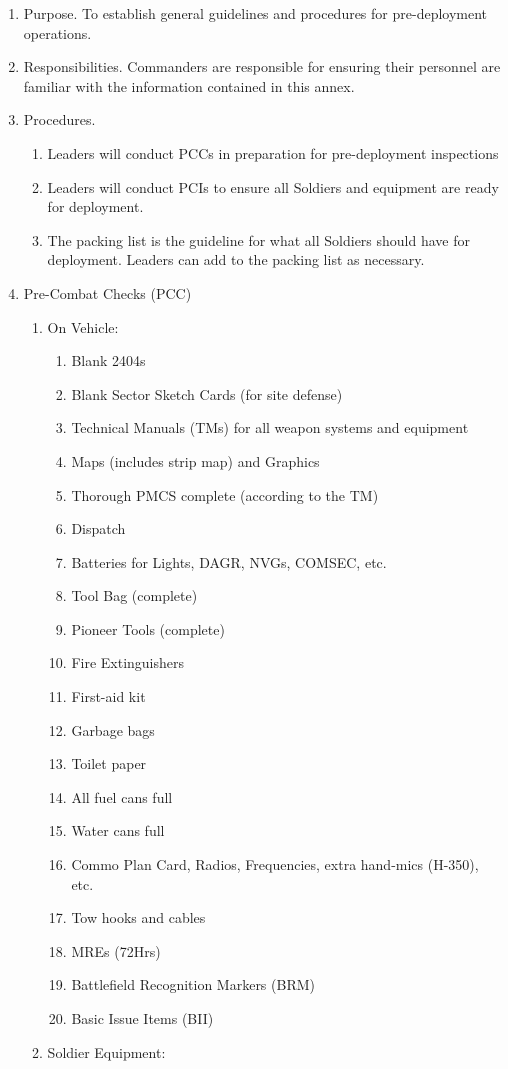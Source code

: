 \documentclass{article}
\begin{document}
\begin{enumerate}
    \item Purpose.  To establish general guidelines and procedures for pre-deployment operations.

\item Responsibilities.  Commanders are responsible for ensuring their personnel are familiar with the information contained in this annex.

\item Procedures.
\begin{enumerate}
    \item Leaders will conduct PCCs in preparation for pre-deployment inspections
	\item Leaders will conduct PCIs to ensure all Soldiers and equipment are ready for deployment.
	\item The packing list is the guideline for what all Soldiers should have for deployment. Leaders can add to the packing list as necessary.
\end{enumerate}
\item Pre-Combat Checks (PCC)
\begin{enumerate}
    \item On Vehicle:
    \begin{enumerate}
         
\item	Blank 2404s					
\item	Blank Sector Sketch Cards (for site defense)
\item	Technical Manuals (TMs) for all weapon systems and equipment
\item Maps (includes strip map) and Graphics
\item	Thorough PMCS complete (according to the TM)
\item Dispatch
\item Batteries for Lights, DAGR, NVGs, COMSEC, etc.
\item Tool Bag (complete)
\item Pioneer Tools (complete)
\item Fire Extinguishers
\item First-aid kit
\item Garbage bags
\item Toilet paper
\item All fuel cans full
\item Water cans full
\item	Commo Plan Card, Radios, Frequencies, extra hand-mics (H-350), etc.
\item	Tow hooks and cables
\item	MREs (72Hrs)
\item Battlefield Recognition Markers (BRM)
\item Basic Issue Items (BII)
\end{enumerate}
\item Soldier Equipment:
\begin{enumerate}
     

\end{enumerate}
\end{enumerate}
\end{enumerate}
\end{document}

